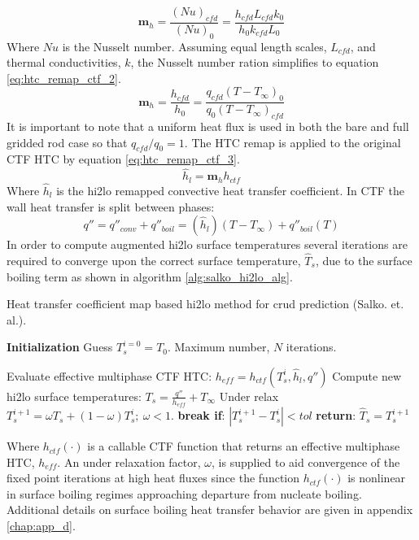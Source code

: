     \begin{equation}
        \mathbf m_h = \frac{(Nu)_{cfd}}{(Nu)_{0}} = \frac{h_{cfd} L_{cfd} k_{0} }{h_{0}k_{cfd} L_{0}}
         \label{eq:htc_remap_ctf_1}
    \end{equation}
    Where $Nu$ is the Nusselt number.  Assuming equal length scales, $L_{cfd}$, and thermal conductivities, $k$, the Nusselt number ration simplifies to equation \ref{eq:htc_remap_ctf_2}.
    \begin{equation}
        \mathbf m_h = \frac{h_{cfd}}{h_{0}} = \frac{q_{cfd}(T-T_\infty)_{0}}{q_{0}(T-T_\infty)_{cfd}}
        \label{eq:htc_remap_ctf_2}
    \end{equation}
    It is important to note that a uniform heat flux is used in both the bare and full gridded rod case so that $q_{cfd}/q_0 =1 $.
    The HTC remap is applied to the original CTF HTC by equation \ref{eq:htc_remap_ctf_3}.
    \begin{equation}
        \hat h_{l} = \mathbf m_h h_{ctf}
        \label{eq:htc_remap_ctf_3}
    \end{equation}
    Where $\hat h_l$ is the hi2lo remapped convective heat transfer coefficient.  In CTF the wall heat transfer is split between phases:
    \begin{equation}
        q'' = q''_{conv} + q''_{boil} = (\hat h_l)(T-T_{\infty}) + q''_{boil}(T)
    \end{equation}
    In order to compute augmented hi2lo surface temperatures
    several iterations are required to converge upon the correct surface temperature, $\hat T_s$, due to the surface boiling term as shown in algorithm \ref{alg:salko_hi2lo_alg}.  

    \begin{algorithm}[H]
        \caption{Heat transfer coefficient map based hi2lo method for crud prediction (Salko. et. al.).}
    \begin{algorithmic}[1]
    \STATE \textbf{Initialization} 
    \STATE Guess $T^{i=0}_s=T_0$.  Maximum number, $N$ iterations.

           \STATE Evaluate effective multiphase CTF HTC: $h_{eff} = h_{{ctf}}(T^i_{s}, \hat h_l, q'')$ \;
           \STATE Compute new hi2lo surface temperatures: $T_{s} = \frac{q''}{h_{eff}} + T_\infty$ \;
           \STATE  Under relax  $T^{i+1}_{s} = \omega T_{s} + (1 - \omega) T^{i}_{s} ;\ \omega < 1.$ \;
           \STATE  \textbf{break if}:  $|T^{i+1}_s - T^i_s| < tol$ \;
        \ENDFOR 
    \STATE \textbf{return}: $\hat T_s = T^{i+1}_s$
    \end{algorithmic}
    \label{alg:salko_hi2lo_alg}
    \end{algorithm}
    Where $h_{ctf}(\cdot)$ is a callable CTF function that returns an effective multiphase HTC, $h_{eff}$.  An under relaxation factor, $\omega$, is supplied to aid convergence of the fixed point iterations at high heat fluxes since the function $h_{ctf}(\cdot)$ is nonlinear in surface boiling regimes approaching departure from nucleate boiling.  Additional details on surface boiling heat transfer behavior are given in appendix \ref{chap:app_d}.

